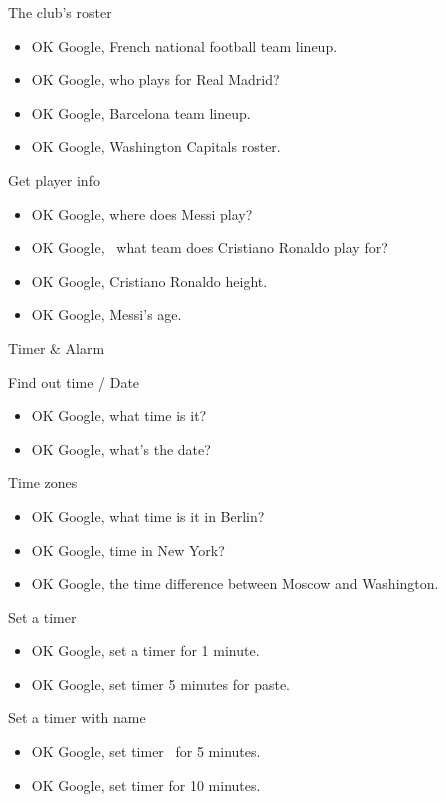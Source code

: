 \documentclass[
  a4paper,
]{article}
\begin{document}
The club's roster

\begin{itemize}
\item
  OK Google, French national football team lineup.
\item
  OK Google, who plays for Real Madrid?
\item
  OK Google, Barcelona team lineup.
\item
  OK Google, Washington Capitals roster.
\end{itemize}

Get player info

\begin{itemize}
\item
  OK Google, where does Messi play?
\item
  OK Google,~ what team does Cristiano Ronaldo play for?
\item
  OK Google, Cristiano Ronaldo height.
\item
  OK Google, Messi's age.
\end{itemize}

Timer \& Alarm

Find out time / Date

\begin{itemize}
\item
  OK Google, what time is it?
\item
  OK Google, what's the date?
\end{itemize}

Time zones

\begin{itemize}
\item
  OK Google, what time is it in Berlin?
\item
  OK Google, time in New York?
\item
  OK Google, the time difference between Moscow and Washington.
\end{itemize}

Set a timer

\begin{itemize}
\item
  OK Google, set a timer for 1 minute.
\item
  OK Google, set timer 5 minutes for paste.
\end{itemize}

Set a timer with name

\begin{itemize}
\item
  OK Google, set timer~ for 5 minutes.
\item
  OK Google, set timer for 10 minutes.
\end{itemize}
\end{document}
